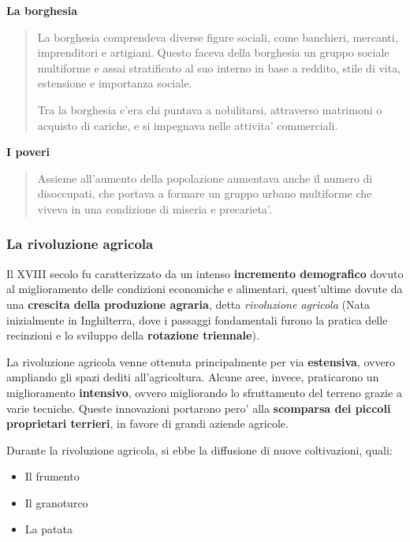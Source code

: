 \documentclass{article}
\begin{document}
{{    \textbf{La borghesia}
    \begin{quote}
      La borghesia comprendeva diverse figure sociali, come banchieri, mercanti, imprenditori e artigiani. Questo faceva della borghesia un gruppo sociale multiforme e assai stratificato al suo interno in base a reddito, stile di vita, estensione e importanza sociale.

      Tra la borghesia c'era chi puntava a nobilitarsi, attraverso matrimoni o acquisto di cariche, e si impegnava nelle attivita' commerciali.
    \end{quote}

    \textbf{I poveri}
    \begin{quote}
      Assieme all'aumento della popolazione aumentava anche il numero di disoccupati, che portava a formare un gruppo urbano multiforme che viveva in una condizione di miseria e precarieta'.
    \end{quote}

    \subsubsection{La rivoluzione agricola} %
    Il XVIII secolo fu caratterizzato da un intenso \textbf{incremento demografico} dovuto al miglioramento delle condizioni economiche e alimentari, quest'ultime dovute da una \textbf{crescita della produzione agraria}, detta \textit{rivoluzione agricola} \small{(Nata inizialmente in Inghilterra, dove i passaggi fondamentali furono la pratica delle recinzioni e lo sviluppo della \textbf{rotazione triennale})}.

    La rivoluzione agricola venne ottenuta principalmente per via \textbf{estensiva}, ovvero ampliando gli spazi dediti all'agricoltura. Alcune aree, invece, praticarono un miglioramento \textbf{intensivo}, ovvero migliorando lo sfruttamento del terreno grazie a varie tecniche. Queste innovazioni portarono pero' alla \textbf{scomparsa dei piccoli proprietari terrieri}, in favore di grandi aziende agricole.

    Durante la rivoluzione agricola, si ebbe la diffusione di nuove coltivazioni, quali:

    \begin{itemize}
      \item Il frumento
      \item Il granoturco
      \item La patata
    \end{itemize}

}}
\end{document}
